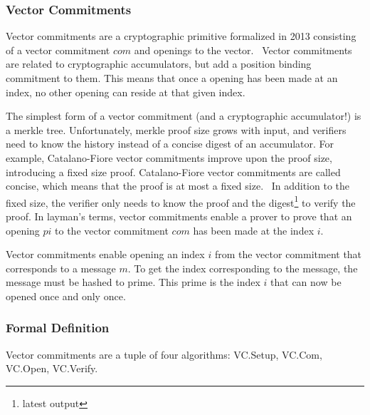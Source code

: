 \subsubsection{Vector Commitments}
Vector commitments are a cryptographic primitive formalized in 2013 consisting of a vector commitment \(com\) and openings to the vector.~\cite{Catalano2013-jn} Vector commitments are related to cryptographic accumulators, but add a position binding commitment to them. This means that once a opening has been made at an index, no other opening can reside at that given index.

The simplest form of a vector commitment (and a cryptographic accumulator!) is a merkle tree. Unfortunately, merkle proof size grows with input, and verifiers need to know the history instead of a concise digest of an accumulator. For example, Catalano-Fiore vector commitments improve upon the proof size, introducing a fixed size proof. Catalano-Fiore vector commitments are called concise, which means that the proof is at most a fixed size.~\cite{Catalano2013-jn} In addition to the fixed size, the verifier only needs to know the proof and the digest\footnote{latest output} to verify the proof. In layman's terms, vector commitments enable a prover to prove that an opening \(pi\) to the vector commitment \(com\) has been made at the index \(i\).

Vector commitments enable opening an index \(i\) from the vector commitment that corresponds to a message \(m\). To get the index corresponding to the message, the message must be hashed to prime. This prime is the index \(i\) that can now be opened once and only once.

\subsubsection{Formal Definition}
Vector commitments are a tuple of four algorithms: VC.Setup, VC.Com, VC.Open, VC.Verify.~\cite{Boneh2019-tk}

